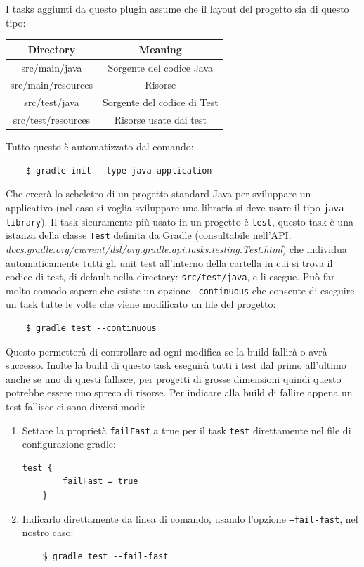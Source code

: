I tasks aggiunti da questo plugin assume che il layout del progetto sia di questo tipo:
\begin{center}
\begin{tabular}{|c|c|}
\hline
Directory & Meaning  \\
\hline
\hline
    src/main/java & Sorgente del codice Java\\
    src/main/resources & Risorse \\
    src/test/java & Sorgente del codice di Test \\
    src/test/resources & Risorse usate dai test \\
\hline
\end{tabular}
\end{center}
Tutto questo è automatizzato dal comando:
\begin{verbatim}
    $ gradle init --type java-application\end{verbatim}
Che creerà lo scheletro di un progetto standard Java per sviluppare un applicativo (nel caso si voglia sviluppare una libraria si deve usare il tipo \texttt{java-library}). Il task sicuramente più usato in un progetto è \texttt{test}, questo task è una istanza della classe \texttt{Test} definita da Gradle (consultabile nell'API: \textit{\href{https://docs.gradle.org/current/dsl/org.gradle.api.tasks.testing.Test.html}{docs.gradle.org/current/dsl/org.gradle.api.tasks.testing.Test.html}}) che individua automaticamente tutti gli unit test all'interno della cartella in cui si trova il codice di test, di default nella directory: \texttt{src/test/java}, e li esegue. Può far molto comodo sapere che esiste un opzione \texttt{--continuous} che consente di eseguire un task tutte le volte che viene modificato un file del progetto:
\begin{verbatim}
    $ gradle test --continuous\end{verbatim}
Questo permetterà di controllare ad ogni modifica se la build fallirà o avrà successo. Inolte la build di questo task eseguirà tutti i test dal primo all'ultimo anche se uno di questi fallisce, per progetti di grosse dimensioni quindi questo potrebbe essere uno spreco di risorse. Per indicare alla build di fallire appena un test fallisce ci sono diversi modi:
\begin{enumerate}
    \item Settare la proprietà \texttt{failFast} a true per il task \texttt{test} direttamente nel file di configurazione gradle:
    \begin{lstlisting}[frame=single]
    test {
        failFast = true
    }
    \end{lstlisting}
    \item Indicarlo direttamente da linea di comando, usando l'opzione \texttt{--fail-fast}, nel nostro caso:
\begin{verbatim}
    $ gradle test --fail-fast \end{verbatim}
\end{enumerate}
